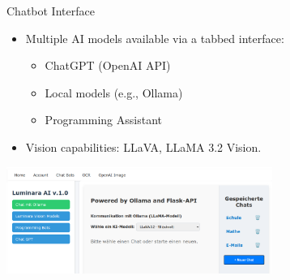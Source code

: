 \documentclass{beamer}
\begin{document}
\begin{frame}{Chatbot Interface}
    \begin{itemize}
        \item Multiple AI models available via a tabbed interface:
            \begin{itemize}
                \item ChatGPT (OpenAI API)
                \item Local models (e.g., Ollama)
                \item Programming Assistant
            \end{itemize}
        \item Vision capabilities: LLaVA, LLaMA 3.2 Vision.
    \end{itemize}
    \vspace{0.1cm}
    \centering
    \includegraphics[width=0.65\textwidth]{Chat-Bot-Navigation-Bar.png}
\end{frame}
\end{document}
